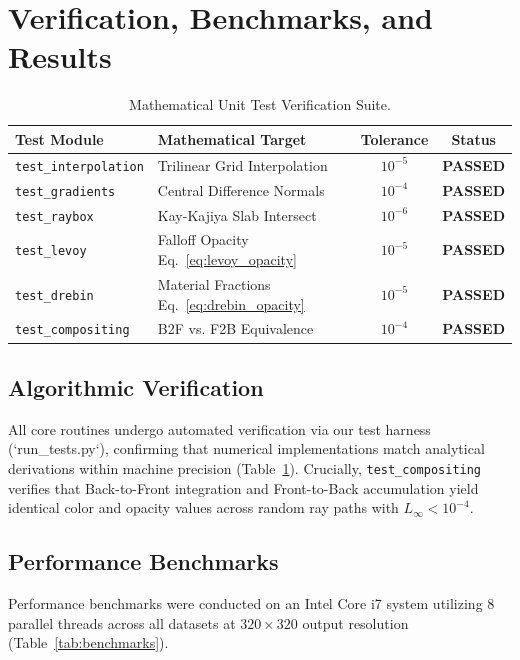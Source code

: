 \documentclass[10pt,twocolumn,a4paper]{article}
\begin{document}
\section{Verification, Benchmarks, and Results}

\begin{table}[b]
\centering
\small
\caption{Mathematical Unit Test Verification Suite.}
\label{tab:unit_tests}
\begin{tabular}{@{}llcc@{}}
\toprule
\textbf{Test Module} & \textbf{Mathematical Target} & \textbf{Tolerance} & \textbf{Status} \\ \midrule
\texttt{test\_interpolation} & Trilinear Grid Interpolation & $10^{-5}$ & \textbf{PASSED} \\
\texttt{test\_gradients} & Central Difference Normals & $10^{-4}$ & \textbf{PASSED} \\
\texttt{test\_raybox} & Kay-Kajiya Slab Intersect & $10^{-6}$ & \textbf{PASSED} \\
\texttt{test\_levoy} & Falloff Opacity Eq.~\eqref{eq:levoy_opacity} & $10^{-5}$ & \textbf{PASSED} \\
\texttt{test\_drebin} & Material Fractions Eq.~\eqref{eq:drebin_opacity} & $10^{-5}$ & \textbf{PASSED} \\
\texttt{test\_compositing} & B2F vs. F2B Equivalence & $10^{-4}$ & \textbf{PASSED} \\ \bottomrule
\end{tabular}
\end{table}

\subsection{Algorithmic Verification}
All core routines undergo automated verification via our test harness (`run_tests.py`), confirming that numerical implementations match analytical derivations within machine precision (Table~\ref{tab:unit_tests}). Crucially, \texttt{test\_compositing} verifies that Back-to-Front integration and Front-to-Back accumulation yield identical color and opacity values across random ray paths with $L_\infty < 10^{-4}$.

\subsection{Performance Benchmarks}
Performance benchmarks were conducted on an Intel Core i7 system utilizing 8 parallel threads across all datasets at $320 \times 320$ output resolution (Table~\ref{tab:benchmarks}).
\end{document}
